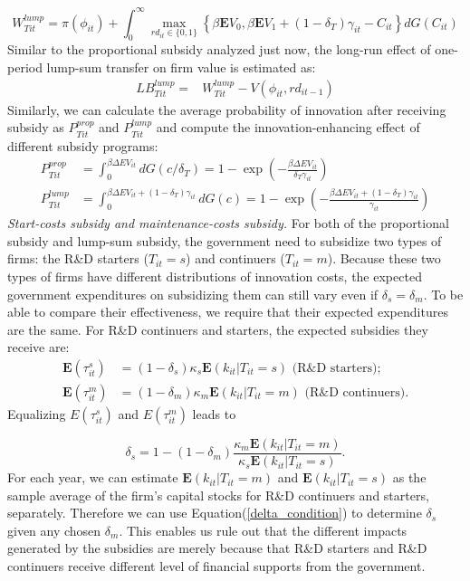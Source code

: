 \documentclass[11pt]{article}
\begin{document}
\begin{equation}\label{wzf}
    W_{Tit}^{lump}=\pi(\phi_{it})+ \int_0^{\infty}\max_{rd_{it}\in\{0,1\}}\left\{\beta \mathbf{E}V_{0},  \beta \mathbf{E}V_{1}+(1-\delta_T)\gamma_{it}-C_{it}\right\}dG(C_{it})
\end{equation}
Similar to the proportional subsidy analyzed just now, the long-run effect of one-period lump-sum transfer on firm value is estimated as:
\begin{align}\label{longsub1}
LB_{Tit}^{lump}=& W_{Tit}^{lump}-V(\phi_{it}, rd_{it-1})
\end{align}
Similarly, we can calculate the average probability of innovation after receiving subsidy as $P_{Tit}^{prop}$ and $P_{Tit}^{lump}$ and compute the innovation-enhancing effect of different subsidy programs: 
\begin{align}
    P_{Tit}^{prop} & = \int_0^{\beta \Delta EV_{it}}dG(c/\delta_T)=1-\exp \left(-\frac{\beta \Delta EV_{it}}{\delta_T \gamma_{it}}\right)  \\
    P_{Tit}^{lump} & =\int_0^{\beta \Delta EV_{it}+(1-\delta_T)\gamma_{it}}dG(c) = 1-\exp \left(-\frac{\beta \Delta EV_{it}+(1-\delta_T)\gamma_{it}} {\gamma_{it}}\right)
\end{align}
\textit{Start-costs subsidy and maintenance-costs subsidy.} For both of the proportional subsidy and lump-sum subsidy, the government need to subsidize two types of firms: the R\&D starters ($T_{it}=s$) and continuers ($T_{it}=m$). Because these two types of firms have different distributions of innovation costs, the expected government expenditures on subsidizing them can still vary even if $\delta_s = \delta_m$. To be able to compare their effectiveness, we require that their expected expenditures are the same. For R\&D continuers and starters, the expected subsidies they receive are:
\begin{align*}
    \mathbf{E}(\tau_{it}^s) & = (1-\delta_s)\kappa_s\mathbf{E}(k_{it}|T_{it}=s) \,\, \text{(R\&D starters)}; \\
    \mathbf{E}(\tau_{it}^m)& = (1-\delta_m)\kappa_m\mathbf{E}(k_{it}|T_{it}=m) \,\, \text{(R\&D continuers)}.
\end{align*}
Equalizing $E(\tau_{it}^s)$ and $E(\tau_{it}^m)$ leads to 

\begin{equation}\label{delta_condition}
\delta_s= 1-(1-\delta_m)\frac{\kappa_m \mathbf{E}(k_{it}|T_{it}=m)}{\kappa_s \mathbf{E}(k_{it}|T_{it}=s)}.
\end{equation}
For each year, we can estimate $\mathbf{E}(k_{it}|T_{it}=m)$ and $\mathbf{E}(k_{it}|T_{it}=s)$ as the sample average of the firm's capital stocks for R\&D continuers and starters, separately. Therefore we can use Equation(\ref{delta_condition}) to determine $\delta_s$ given any chosen $\delta_m$. This enables us rule out that the different impacts generated by the subsidies are merely because that R\&D starters and R\&D continuers receive different level of financial supports from the government. 
\end{document}
